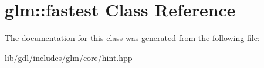 \hypertarget{classglm_1_1fastest}{}\section{glm\+:\+:fastest Class Reference}
\label{classglm_1_1fastest}


The documentation for this class was generated from the following file\+:\begin{DoxyCompactItemize}
\item 
lib/gdl/includes/glm/core/\hyperlink{hint_8hpp}{hint.\+hpp}\end{DoxyCompactItemize}
